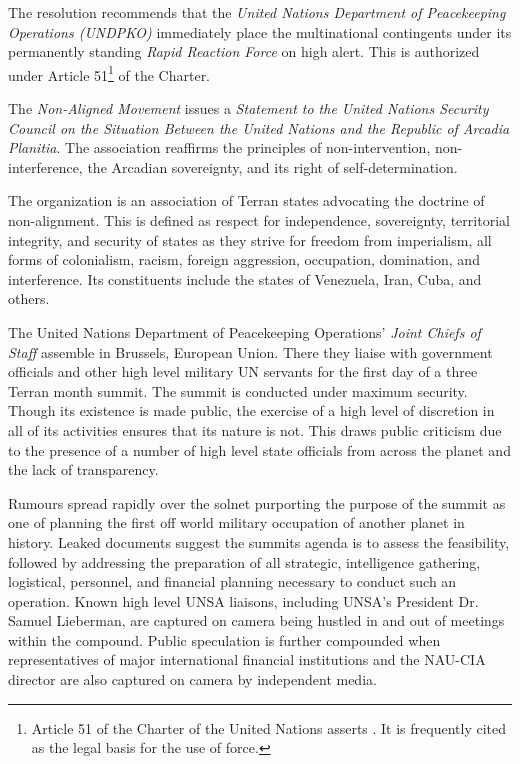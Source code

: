 The resolution recommends that the {\it United Nations Department of Peacekeeping Operations (UNDPKO)} immediately place the multinational contingents under its permanently standing {\it Rapid Reaction Force} on high alert. This is authorized under Article 51\footnote{Article 51 of the Charter of the United Nations asserts . It is frequently cited as the legal basis for the use of force.} of the Charter.
\StopTimelineDate

The {\it Non-Aligned Movement} issues a {\it Statement to the United Nations Security Council on the Situation Between the United Nations and the Republic of Arcadia Planitia}. The association reaffirms the principles of non-intervention, non-interference, the Arcadian sovereignty, and its right of self-determination.

The organization is an association of Terran states advocating the doctrine of non-alignment. This is defined as respect for independence, sovereignty, territorial integrity, and security of states as they strive for freedom from imperialism, all forms of colonialism, racism, foreign aggression, occupation, domination, and interference. Its constituents include the states of Venezuela, Iran, Cuba, and others.
\StopTimelineDate

The United Nations Department of Peacekeeping Operations' {\it Joint Chiefs of Staff} assemble in Brussels, European Union. There they liaise with government officials and other high level military UN servants for the first day of a three Terran month summit. The summit is conducted under maximum security. Though its existence is made public, the exercise of a high level of discretion in all of its activities ensures that its nature is not. This draws public criticism due to the presence of a number of high level state officials from across the planet and the lack of transparency.

Rumours spread rapidly over the solnet purporting the purpose of the summit as one of planning the first off world military occupation of another planet in history. Leaked documents suggest the summits agenda is to assess the feasibility, followed by addressing the preparation of all strategic, intelligence gathering, logistical, personnel, and financial planning necessary to conduct such an operation. Known high level UNSA liaisons, including UNSA's President Dr. Samuel Lieberman, are captured on camera being hustled in and out of meetings within the compound. Public speculation is further compounded when representatives of major international financial institutions and the NAU-CIA director are also captured on camera by independent media.
\StopTimelineDate

